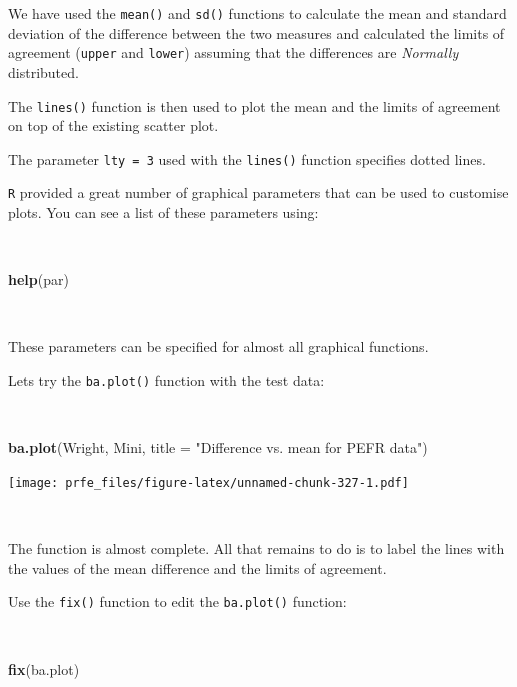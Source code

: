\documentclass[12pt,a4paper]{book}
\newenvironment{Shaded}{\begin{snugshade}}{\end{snugshade}}
\newcommand{\DataTypeTok}[1]{\textcolor[rgb]{0.13,0.29,0.53}{#1}}
\newcommand{\KeywordTok}[1]{\textcolor[rgb]{0.13,0.29,0.53}{\textbf{#1}}}
\newcommand{\NormalTok}[1]{#1}
\newcommand{\StringTok}[1]{\textcolor[rgb]{0.31,0.60,0.02}{#1}}
\theoremstyle{definition}
\theoremstyle{definition}
\theoremstyle{definition}
\theoremstyle{remark}
\begin{document}
We have used the \texttt{mean()} and \texttt{sd()} functions to
calculate the mean and standard deviation of the difference between the
two measures and calculated the limits of agreement (\texttt{upper} and
\texttt{lower}) assuming that the differences are \emph{Normally}
distributed.

The \texttt{lines()} function is then used to plot the mean and the
limits of agreement on top of the existing scatter plot.

The parameter \texttt{lty\ =\ 3} used with the \texttt{lines()} function
specifies dotted lines.

\texttt{R} provided a great number of graphical parameters that can be
used to customise plots. You can see a list of these parameters using:

~

\begin{Shaded}
\begin{Highlighting}[]
\KeywordTok{help}\NormalTok{(par)}
\end{Highlighting}
\end{Shaded}

~

These parameters can be specified for almost all graphical functions.

Lets try the \texttt{ba.plot()} function with the test data:

~

\begin{Shaded}
\begin{Highlighting}[]
\KeywordTok{ba.plot}\NormalTok{(Wright, Mini, }\DataTypeTok{title =} \StringTok{"Difference vs. mean for PEFR data"}\NormalTok{)}
\end{Highlighting}
\end{Shaded}

\texttt{[image: prfe\_files/figure-latex/unnamed-chunk-327-1.pdf]}

~

The function is almost complete. All that remains to do is to label the
lines with the values of the mean difference and the limits of
agreement.

Use the \texttt{fix()} function to edit the \texttt{ba.plot()} function:

~

\begin{Shaded}
\begin{Highlighting}[]
\KeywordTok{fix}\NormalTok{(ba.plot)}
\end{Highlighting}
\end{Shaded}
\end{document}
